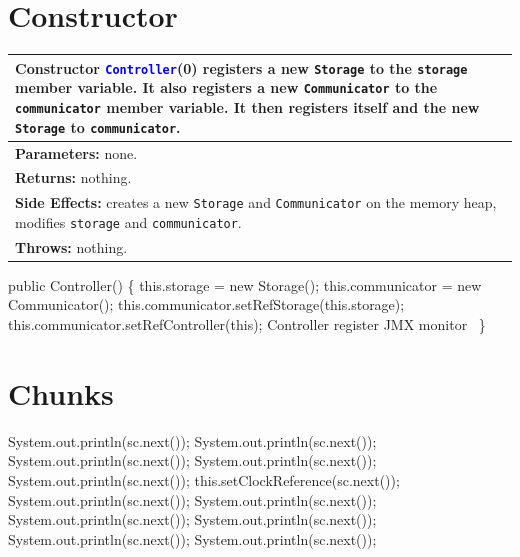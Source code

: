 \section{Constructor}
\begin{tabular}{p{\textwidth}}
\toprule
\rowcolor{TableTitle}
Constructor \textcolor{blue}{{\tt{}Controller}}(0) registers a new {\tt{}Storage} to
the {\tt{}storage} member variable. It also registers a new {\tt{}Communicator} to
the {\tt{}communicator} member variable. It then registers itself and the new
{\tt{}Storage} to {\tt{}communicator}.\\
\midrule
\textbf{Parameters:} none.\\
\textbf{Returns:} nothing.\\
\textbf{Side Effects:} creates a new {\tt{}Storage} and {\tt{}Communicator} on the
memory heap, modifies {\tt{}storage} and {\tt{}communicator}.\\
\textbf{Throws:} nothing.\\
\bottomrule
\end{tabular}
\nwenddocs{}\endmoddef{}
public Controller() \{
  this.storage = new Storage();
  this.communicator = new Communicator();
  this.communicator.setRefStorage(this.storage);
  this.communicator.setRefController(this);
  \LA{}\code{}Controller\edoc{} register JMX monitor~{\nwtagstyle{}}\RA{}
\}
\nwendcode{}\nwdocspar

\section{Chunks}
\nwenddocs{}\endmoddef{}
System.out.println(sc.next());
System.out.println(sc.next());
System.out.println(sc.next());
System.out.println(sc.next());
System.out.println(sc.next());
this.setClockReference(sc.next());
System.out.println(sc.next());
System.out.println(sc.next());
System.out.println(sc.next());
System.out.println(sc.next());
System.out.println(sc.next());
System.out.println(sc.next());
\nwendcode{}\nwdocspar

